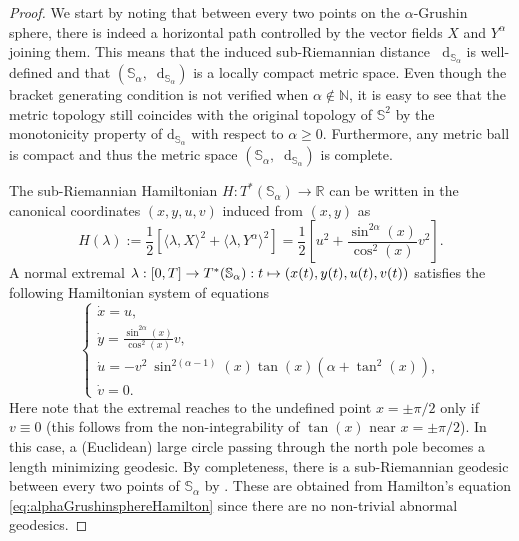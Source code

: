 \documentclass[11pt,twoside,a4paper]{article}
\newcommand{\red}{\color{red}}
\newcommand*\diff{\mathop{}\!\mathrm{d}}
\newcommand{\N}{\mathbb{N}}
\newcommand{\R}{\mathbb{R}}
\renewcommand{\S}{\mathbb{S}}
\theoremstyle{theorem}
\theoremstyle{definition}
\theoremstyle{remark}
\theoremstyle{proof}
\begin{document}
\begin{proof}
We start by noting that between every two points on the $\alpha$-Grushin sphere, there is indeed a horizontal path controlled by the vector fields $X$ and $Y^{\alpha}$ joining them. This means that the induced sub-Riemannian distance $\diff_{\S_\alpha}$ is well-defined and that $(\S_\alpha, \diff_{\S_\alpha})$ is a locally compact metric space. Even though the bracket generating condition is not verified when $\alpha \notin \N$, it is easy to see that the metric topology still coincides with the original topology of $\S^2$ by the monotonicity property of $\mathrm{d}_{\S_\alpha}$ with respect to $\alpha \geq 0$. Furthermore, any metric ball is compact and thus the metric space $(\S_\alpha, \diff_{\S_\alpha})$ is complete.

The sub-Riemannian Hamiltonian $H : T^*(\S_\alpha) \to \R$ can be written in the canonical coordinates $(x, y, u,v )$ induced from $(x, y)$  as
\[
H(\lambda):=\frac{1}{2}\left[\langle \lambda,X\rangle^2+\langle\lambda,Y^\alpha\rangle^2\right]=\frac{1}{2}\left[u^2+\frac{\sin^{2\alpha}(x)}{\cos^2(x)}v^2\right].
\]
A normal extremal $\lambda : \interval{0}{T} \to T^*(\S_\alpha) : t \mapsto (x(t), y(t), u(t), v(t))$ satisfies the following Hamiltonian system of equations
\begin{equation}
    \label{eq:alphaGrushinsphereHamilton}
    \begin{cases}
    \dot{x}=u,\\
    \displaystyle \dot{y}=\frac{\sin^{2\alpha}(x)}{\cos^2(x)}v,\\
    \displaystyle \dot{u}= -  v^2 \  \sin^{2(\alpha - 1)}(x) \tan(x) (\alpha + \tan^2(x)),\\
    \dot{v}=0.
\end{cases}
\end{equation}
Here note that the extremal reaches to the undefined point $x=\pm \pi/2$ only if $v\equiv 0$ (this follows from the non-integrability of $\tan(x)$ near $x=\pm\pi/2$). In this case, a (Euclidean) large circle passing through the north pole becomes a length minimizing geodesic. By completeness, there is a sub-Riemannian geodesic between every two points of $\S_\alpha$ by \cite[Theorem 2.5.23]{burago-burago-sergei2001}. These are obtained from Hamilton's equation \cref{eq:alphaGrushinsphereHamilton} since there are no non-trivial abnormal geodesics.


\end{proof}
\end{document}
